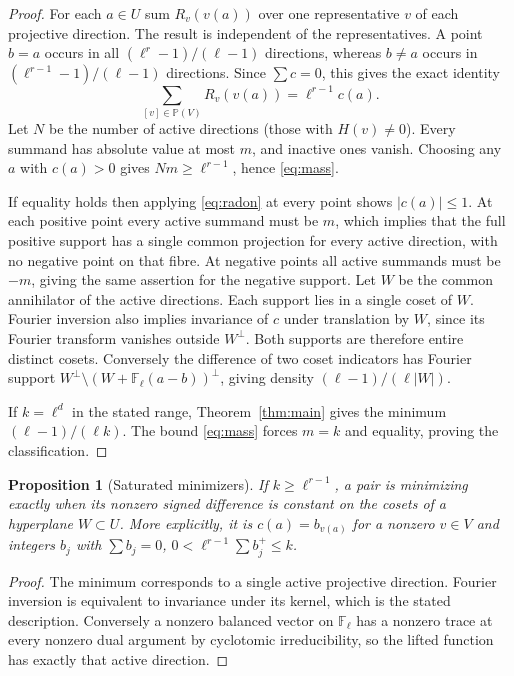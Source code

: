 \documentclass[11pt]{article}
\newtheorem{proposition}[theorem]{Proposition}
\theoremstyle{remark}\newtheorem{remark}[theorem]{Remark}
\newcommand{\F}{\mathbb F}
\begin{document}
\begin{proof}
For each $a\in U$ sum $R_v(v(a))$ over one representative $v$ of each projective direction. The result is independent of the representatives. A point $b=a$ occurs in all $(\ell^r-1)/(\ell-1)$ directions, whereas $b\ne a$ occurs in $(\ell^{r-1}-1)/(\ell-1)$ directions. Since $\sum c=0$, this gives the exact identity
\begin{equation}\label{eq:radon}
 \sum_{[v]\in\mathbb P(V)} R_v(v(a))=\ell^{r-1}c(a).
\end{equation}
Let $N$ be the number of active directions (those with $H(v)\ne0$). Every summand has absolute value at most $m$, and inactive ones vanish. Choosing any $a$ with $c(a)>0$ gives $Nm\ge\ell^{r-1}$, hence \eqref{eq:mass}.

If equality holds then applying \eqref{eq:radon} at every point shows $|c(a)|\le1$. At each positive point every active summand must be $m$, which implies that the full positive support has a single common projection for every active direction, with no negative point on that fibre. At negative points all active summands must be $-m$, giving the same assertion for the negative support. Let $W$ be the common annihilator of the active directions. Each support lies in a single coset of $W$. Fourier inversion also implies invariance of $c$ under translation by $W$, since its Fourier transform vanishes outside $W^\perp$. Both supports are therefore entire distinct cosets. Conversely the difference of two coset indicators has Fourier support $W^\perp\setminus(W+\F_\ell(a-b))^\perp$, giving density $(\ell-1)/(\ell|W|)$.

If $k=\ell^d$ in the stated range, Theorem~\ref{thm:main} gives the minimum $(\ell-1)/(\ell k)$. The bound \eqref{eq:mass} forces $m=k$ and equality, proving the classification.
\end{proof}

\begin{proposition}[Saturated minimizers]\label{prop:saturated}
If $k\ge\ell^{r-1}$, a pair is minimizing exactly when its nonzero signed difference is constant on the cosets of a hyperplane $W\subset U$. More explicitly, it is $c(a)=b_{v(a)}$ for a nonzero $v\in V$ and integers $b_j$ with $\sum b_j=0$, $0<\ell^{r-1}\sum b_j^+\le k$.
\end{proposition}
\begin{proof}
The minimum corresponds to a single active projective direction. Fourier inversion is equivalent to invariance under its kernel, which is the stated description. Conversely a nonzero balanced vector on $\F_\ell$ has a nonzero trace at every nonzero dual argument by cyclotomic irreducibility, so the lifted function has exactly that active direction.
\end{proof}
\end{document}
